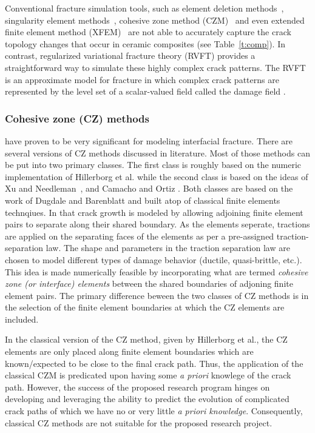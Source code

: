 \documentclass[10pt,letterpaper]{article}
\begin{document}
    Conventional fracture simulation tools, such as element deletion methods~\cite{komori2001simulation,saanouni2004numerical}, singularity element methods~\cite{henshell1975crack,barsoum1977triangular,akin1976generation}, cohesive zone method (CZM)~\cite{needleman1987continuum,tan2007constitutive} and even extended finite element method (XFEM)~\cite{dolbow1999finite, stolarska2001modelling, belytschko2003dynamic,huang2003modeling} are not able to accurately capture the crack topology changes that occur in ceramic composites (see Table~\ref{t:comp}). In contrast, regularized variational fracture theory (RVFT) provides a straightforward way to simulate these highly complex crack patterns. The RVFT is an approximate model for fracture in which complex crack patterns are represented by the level set of a scalar-valued field called the damage field \cite{bourdin2000numerical}.

    \subsubsection{Cohesive zone (CZ) methods} have proven to be very significant for modeling interfacial fracture. There are several versions of CZ methods discussed in literature. Most of those methods can be put into two primary classes. The first class is roughly based on the numeric implementation of Hillerborg et al.\cite{hillerborg1976analysis}  while the second class is based on the ideas of Xu and Needleman~\cite{xu1994numerical}, and Camacho and Ortiz \cite{camacho1996computational}. Both classes are based on the work of Dugdale \cite{dugdale1960yielding} and Barenblatt \cite{barenblatt1962mathematical} and built atop of classical finite elements technqiues. In that crack growth is modeled by allowing adjoining finite  element pairs to separate along their shared boundary. As the elements seperate, tractions are applied on the separating faces of the elements as per a pre-assigned traction-separation law. The shape and parameters in the traction separation law are chosen to model different types of damage behavior (ductile, quasi-brittle, etc.). This idea is made numerically feasible by incorporating what are termed \textit{cohesive zone (or interface) elements} between the shared boundaries of adjoning finite element pairs. The primary difference beween the two classes of CZ methods is in the selection of the finite element boundaries at which the CZ elements are included.

    In the classical version of the CZ method, given by Hillerborg et al., the CZ elements are only placed along finite element boundaries which are known\slash expected to be close to the final crack path. Thus, the application of the classical CZM is  predicated upon having some \textit{a priori} knowlege of the crack path. However, the success of the proposed research program hinges on developing and leveraging the ability to predict the evolution of complicated crack paths of which we have no or very little \textit{a priori knowledge}. Consequently, classical CZ methods are not suitable for the proposed research project.%
\end{document}
